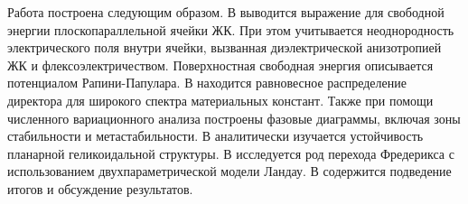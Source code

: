 Работа построена следующим образом. В  выводится выражение для свободной энергии плоскопараллельной ячейки ЖК.
При этом учитывается неоднородность электрического поля внутри ячейки, вызванная диэлектрической анизотропией ЖК и флексоэлектричеством.
Поверхностная свободная энергия описывается потенциалом Рапини-Папулара.
В  находится равновесное распределение директора для широкого спектра материальных констант.
Также при помощи численного вариационного анализа построены фазовые диаграммы, включая зоны стабильности и метастабильности.
В  аналитически изучается устойчивость планарной геликоидальной структуры.
В  исследуется род перехода Фредерикса с использованием двухпараметрической модели Ландау.
В  содержится подведение итогов и обсуждение результатов.
\fi
